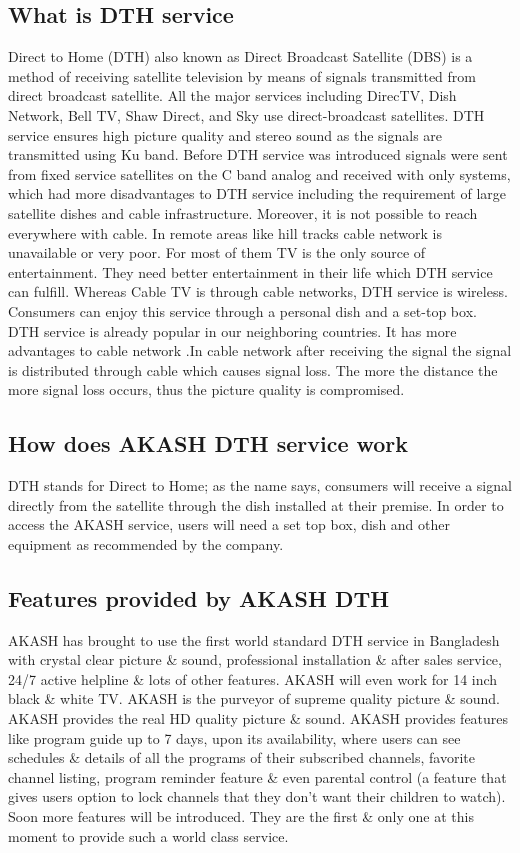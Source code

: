 \begin{spacing}{1.0}
\subsection{What is DTH service}
Direct to Home (DTH) also known as Direct Broadcast Satellite (DBS) is a method of receiving satellite television by means of signals transmitted from direct broadcast satellite. All the major services including DirecTV, Dish Network, Bell TV, Shaw Direct, and Sky use direct-broadcast satellites. DTH service ensures high picture quality and stereo sound as the signals are transmitted using Ku band.
Before DTH service was introduced signals were sent from fixed service satellites on the C band analog and received with only systems, which had more disadvantages to DTH service including the requirement of large satellite dishes and cable infrastructure. Moreover, it is not possible to reach everywhere with cable. In remote areas like hill tracks cable network is unavailable or very poor. For most of them TV is the only source of entertainment. They need better entertainment in their life which DTH service can fulfill. Whereas Cable TV is through cable networks, DTH service is wireless. Consumers can enjoy this service through a personal dish and a set-top box. DTH service is already popular in our neighboring countries. It has more advantages to cable network .In cable network after receiving the signal the signal is distributed through cable which causes signal loss. The more the distance the more signal loss occurs, thus the picture quality is compromised.
\subsection{How does AKASH DTH service work}
DTH stands for Direct to Home; as the name says, consumers will receive a signal directly from the satellite through the dish installed at their premise. In order to access the AKASH service, users will need a set top box, dish and other equipment as recommended by the company. 
\subsection{Features provided by AKASH DTH}
AKASH has brought to use the first world standard DTH service in Bangladesh with crystal clear picture \& sound, professional installation \& after sales service, 24/7 active helpline \& lots of other features. AKASH will even work for 14 inch black \& white TV. AKASH is the purveyor of supreme quality picture \& sound.  AKASH provides the real HD quality picture \& sound. AKASH provides features like program guide up to 7 days, upon its availability, where users can see schedules \& details of all the programs of their subscribed channels, favorite channel listing, program reminder feature \& even parental control (a feature that gives users option to lock channels that they don't want their children to watch). Soon more features will be introduced. They are the first \& only one at this moment to provide such a world class service.

\end{spacing}
